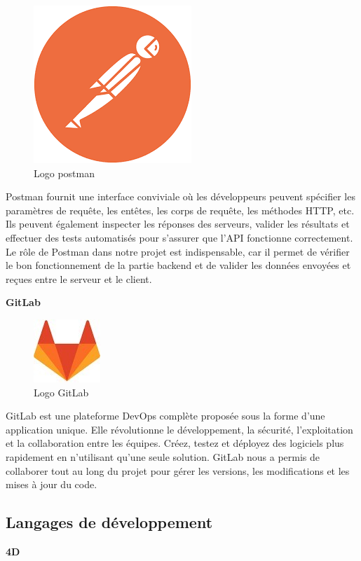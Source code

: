\begin{figure}[htbp]
   \centering
   \includegraphics[scale=0.4]{Images/postman.png} 
   \caption{Logo postman}
   \label{fig:postman}
\end{figure}

Postman fournit une interface conviviale où les développeurs 
peuvent spécifier les paramètres de requête, les entêtes, 
les corps de requête, les méthodes HTTP, etc. Ils peuvent 
également inspecter les réponses des serveurs, valider les 
résultats et effectuer des tests automatisés pour s’assurer que 
l’API fonctionne correctement\cite{Postman}. Le rôle de Postman 
dans notre projet est indispensable, car il permet de vérifier 
le bon fonctionnement de la partie backend et de valider les 
données envoyées et reçues entre le serveur et le client.
\newline

\large 
\textbf{GitLab}

\begin{figure}[htbp]
   \centering
   \includegraphics[scale=0.6]{Images/gitlab.jpg} 
   \caption{Logo GitLab}
   \label{fig:gitlab}
\end{figure}
GitLab est une plateforme DevOps complète proposée sous la forme 
d’une application unique. Elle révolutionne le développement, 
la sécurité, l’exploitation et la collaboration entre les équipes. 
Créez, testez et déployez des logiciels plus rapidement en 
n’utilisant qu’une seule solution. GitLab nous a permis de collaborer tout au long du projet pour gérer les versions, les modifications et les mises à jour du code.
\subsection{Langages de développement}
\large 
\textbf{4D}

